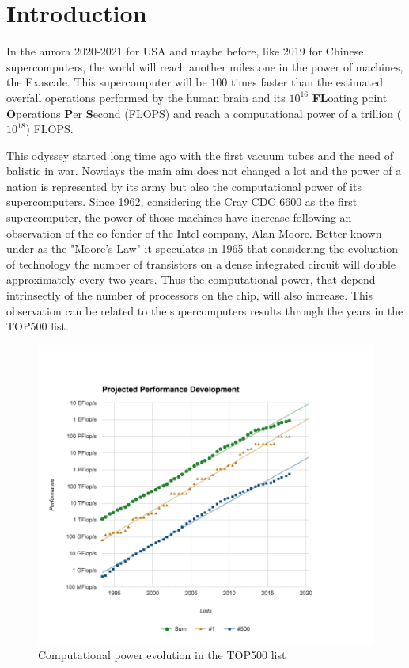 \chapter*{Introduction}


In the aurora 2020-2021 for USA and maybe before, like 2019 for Chinese supercomputers, the world will reach another milestone in the power of machines, the Exascale. 
This supercomputer will be $100$ times faster than the estimated overfall operations performed by the human brain and its $10^{16}$ \textbf{FL}oating point \textbf{O}perations \textbf{P}er \textbf{S}econd (FLOPS) and reach a computational power of a trillion ($10^{18}$) FLOPS.

This odyssey started long time ago with the first vacuum tubes and the need of balistic in war. 
Nowdays the main aim does not changed a lot and the power of a nation is represented by its army but also the computational power of its supercomputers. 
Since 1962, considering the Cray CDC 6600 as the first supercomputer, the power of those machines have increase following an observation of the co-fonder of the Intel company, Alan Moore. 
Better known under as the "Moore's Law" it speculates in 1965 that considering the evoluation of technology the number of transistors on a dense integrated circuit will double approximately every two years. 
Thus the computational power, that depend intrinsectly of the number of processors on the chip, will also increase. 
This observation can be related to the supercomputers results through the years in the TOP500 list. 
\begin{figure}
\includegraphics[width=\linewidth]{figures/introduction/top500_list_approximation.png}
\caption{Computational power evolution in the TOP500 list}
\label{fig:intro_top500}
\end{figure}

